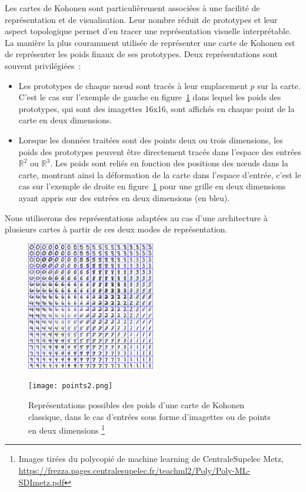 \documentclass[../main]{subfiles}
\begin{document}
Les cartes de Kohonen sont particulièrement associées à une facilité de représentation et de visualisation. Leur nombre réduit de prototypes et leur aspect topologique permet d'en tracer une représentation visuelle interprétable.
La manière la plus couramment utilisée de représenter une carte de Kohonen est de représenter les poids finaux de ses prototypes. 
Deux représentations sont souvent privilégiées~:
\begin{itemize}
\item Les prototypes de chaque n\oe{}ud sont tracés à leur emplacement $p$ sur la carte. 
C'est le cas sur l'exemple de gauche en figure~\ref{fig:representation} dans lequel les poids des prototypes, qui sont des imagettes 16x16, sont affichés en chaque point de la carte en deux dimensions.
\item Lorsque les données traitées sont des points deux ou trois dimensions, les poids des prototypes peuvent être directement tracés dans l'espace des entrées $\mathbb{R}^2$ ou $\mathbb{R}^3$. Les poids sont reliés en fonction des positions des n\oe{}uds dans la carte, montrant ainsi la déformation de la carte dans l'espace d'entrée, c'est le cas sur l'exemple de droite en figure~\ref{fig:representation} pour une grille en deux dimensions ayant appris sur des entrées en deux dimensions (en bleu).
\end{itemize}

Nous utiliserons des représentations adaptées au cas d'une architecture à plusieurs cartes à partir de ces deux modes de représentation.

\begin{figure}
\begin{minipage}{0.5\textwidth}
\centering
\includegraphics[width=0.5\textwidth]{digits.jpg}
\end{minipage}
\begin{minipage}{0.5\textwidth}
\centering
\texttt{[image: points2.png]}
\end{minipage}
\caption{Représentations possibles des poids d'une carte de Kohonen classique, dans le cas d'entrées sous forme d'imagettes ou de points en deux dimensions \footnote{Images tirées du polycopié de machine learning de CentraleSupelec Metz, \url{https://frezza.pages.centralesupelec.fr/teachml2/Poly/Poly-ML-SDImetz.pdf}} \label{fig:representation}}
\end{figure}
\end{document}
